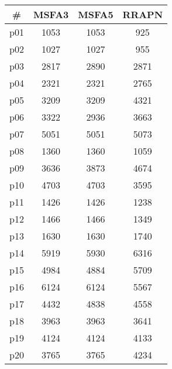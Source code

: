 \begin{tabular}{c||c|c|c}
\textbf{\#} & \textbf{MSFA3} & \textbf{MSFA5} & \textbf{RRAPN}\\
\hline
\hline
p01 & 1053 & 1053 & 925\\
p02 & 1027 & 1027 & 955\\
p03 & 2817 & 2890 & 2871\\
p04 & 2321 & 2321 & 2765\\
p05 & 3209 & 3209 & 4321\\
p06 & 3322 & 2936 & 3663\\
p07 & 5051 & 5051 & 5073\\
p08 & 1360 & 1360 & 1059\\
p09 & 3636 & 3873 & 4674\\
p10 & 4703 & 4703 & 3595\\
p11 & 1426 & 1426 & 1238\\
p12 & 1466 & 1466 & 1349\\
p13 & 1630 & 1630 & 1740\\
p14 & 5919 & 5930 & 6316\\
p15 & 4984 & 4884 & 5709\\
p16 & 6124 & 6124 & 5567\\
p17 & 4432 & 4838 & 4558\\
p18 & 3963 & 3963 & 3641\\
p19 & 4124 & 4124 & 4133\\
p20 & 3765 & 3765 & 4234\\
\end{tabular}

